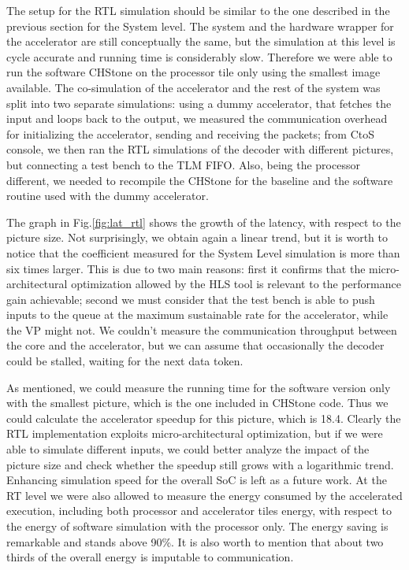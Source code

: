 \documentclass{acm_proc_article-sp}
\begin{document}
The setup for the RTL simulation should be similar to the one described in the previous
section for the System level. The system and the hardware wrapper for the accelerator
are still conceptually the same, but the simulation at this level is cycle accurate
and running time is considerably slow. Therefore we were able to run the software
CHStone on the processor tile only using the smallest image available. The co-simulation
of the accelerator and the rest of the system was split into two separate simulations:
using a dummy accelerator, that fetches the input and loops back to the output, we measured the
communication overhead for initializing the accelerator, sending and receiving the packets;
from CtoS console, we then ran the RTL simulations of the decoder with different pictures, but
connecting a test bench to the TLM FIFO. Also, being the processor different, we needed to
recompile the CHStone for the baseline and the software routine used with the dummy accelerator.

The graph in Fig.\ref{fig:lat_rtl} shows the growth of the latency, with respect to the
picture size. Not surprisingly, we obtain again a linear trend, but it is worth to notice
that the coefficient measured for the System Level simulation is more than six times larger.
This is due to two main reasons: first it confirms that the micro-architectural optimization
allowed by the HLS tool is relevant to the performance gain achievable; second we must
consider that the test bench is able to push inputs to the queue at the maximum sustainable
rate for the accelerator, while the VP might not. We couldn't measure the communication
throughput between the core and the accelerator, but we can assume that occasionally the
decoder could be stalled, waiting for the next data token.


As mentioned, we could measure the running time for the software version only with the
smallest picture, which is the one included in CHStone code. Thus we could calculate
the accelerator speedup for this picture, which is 18.4\texttimes. Clearly the RTL implementation
exploits micro-architectural optimization, but if we were able to simulate different
inputs, we could better analyze the impact of the picture size and check
whether the speedup still grows with a logarithmic trend. Enhancing simulation speed
for the overall SoC is left as a future work.
At the RT level we were also allowed to measure the energy consumed by
the accelerated execution, including both processor and accelerator tiles energy,
with respect to the energy of software simulation with the processor only.
The energy saving is remarkable and stands above 90\%. It is also worth to mention
that about two thirds of the overall energy is imputable to communication.
\end{document}
